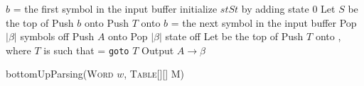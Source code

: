 \documentclass{standalone}
\begin{document}
    \begin{algorithm}[H]
        \label{alg:btmup-parsing}
        \DontPrintSemicolon


        
        \(b\) = the first symbol in the input buffer \;
        initialize \(stSt\) by adding state \(0\) \;
        \While{\t} {
            Let \(S\) be the top of \St \;
             {
                Push \(b\) onto \Symb \;
                Push \(T\) onto \St \;
                \(b\) = the next symbol in the input buffer \;
            }
             {
                Pop \(|\beta|\) symbols off \Symb \;
                Push \(A\) onto \Symb \;
                Pop \(|\beta|\) state off \St \;
                Let \Tmp be the top of \St \;
                Push \(T\) onto \St, where \(T\) is such that  = \texttt{goto} \(T\) \;
                Output \(A \to \beta\) \;
            }
             {
                \Return{} \;
            }
            \Else{
                \ferr{}
            }
        }


        \caption{bottomUpParsing(\textsc{Word} \(w\), \textsc{Table}[][] M)}
    \end{algorithm}
\end{document}

